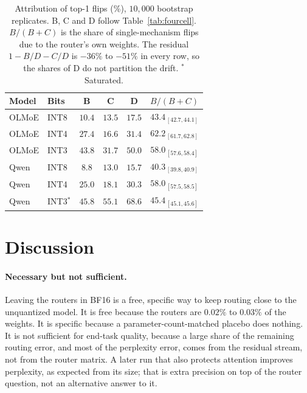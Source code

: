 \documentclass[11pt]{article}
\begin{document}
\begin{table}[t]
\centering
\small
\setlength{\tabcolsep}{3pt}
\begin{tabular}{llcccc}
\toprule
Model & Bits & B & C & D & $B/(B{+}C)$ \\
\midrule
OLMoE & INT8 & $10.4$ & $13.5$ & $17.5$ & $43.4_{\,[42.7,44.1]}$ \\
OLMoE & INT4 & $27.4$ & $16.6$ & $31.4$ & $62.2_{\,[61.7,62.8]}$ \\
OLMoE & INT3 & $43.8$ & $31.7$ & $50.0$ & $58.0_{\,[57.6,58.4]}$ \\
Qwen & INT8 & $8.8$ & $13.0$ & $15.7$ & $40.3_{\,[39.8,40.9]}$ \\
Qwen & INT4 & $25.0$ & $18.1$ & $30.3$ & $58.0_{\,[57.5,58.5]}$ \\
Qwen & INT3$^{*}$ & $45.8$ & $55.1$ & $68.6$ & $45.4_{\,[45.1,45.6]}$ \\
\bottomrule
\end{tabular}
\caption{Attribution of top-1 flips (\%), $10{,}000$ bootstrap
  replicates. B, C and D follow Table~\ref{tab:fourcell}. $B/(B{+}C)$ is
  the share of single-mechanism flips due to the router's own weights.
  The residual $1-B/D-C/D$ is $-36\%$ to $-51\%$ in every row, so the
  shares of D do not partition the drift. $^{*}$Saturated.}
\label{tab:attribution}
\end{table}

\section{Discussion}
\label{sec:discussion}

\paragraph{Necessary but not sufficient.}
Leaving the routers in BF16 is a free, specific way to keep routing close
to the unquantized model. It is free because the routers are $0.02\%$ to
$0.03\%$ of the weights. It is specific because a parameter-count-matched
placebo does nothing. It is not sufficient for end-task quality, because a
large share of the remaining routing error, and most of the perplexity
error, comes from the residual stream, not from the router matrix. A later
run that also protects attention improves perplexity, as expected from its
size; that is extra precision on top of the router question, not an
alternative answer to it.
\end{document}
